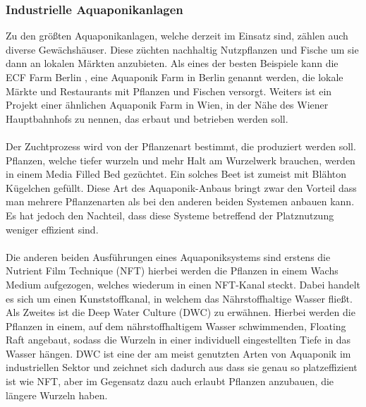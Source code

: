 
\subsubsection {Industrielle Aquaponikanlagen}
Zu den größten Aquaponikanlagen, welche derzeit im Einsatz sind, zählen auch diverse Gewächshäuser. Diese züchten nachhaltig Nutzpflanzen und Fische um sie dann an lokalen Märkten anzubieten. Als eines der besten Beispiele kann die ECF Farm Berlin \cite{ECF}, eine Aquaponik Farm in Berlin \cite{Aquaponik_Anlage_Wien} genannt werden, die lokale Märkte und Restaurants mit Pflanzen und Fischen versorgt. Weiters ist ein Projekt einer ähnlichen Aquaponik Farm in Wien, in der Nähe des Wiener Hauptbahnhofs zu nennen, das erbaut und betrieben werden soll.\\ \mbox{} \\
Der Zuchtprozess wird von der Pflanzenart bestimmt, die produziert werden soll. Pflanzen, welche tiefer wurzeln und mehr Halt am Wurzelwerk brauchen, werden in einem Media Filled Bed gezüchtet. Ein solches Beet ist zumeist mit Blähton Kügelchen gefüllt. Diese Art des Aquaponik-Anbaus bringt zwar den Vorteil dass man mehrere Pflanzenarten als bei den anderen beiden Systemen anbauen kann. Es hat jedoch den Nachteil, dass diese Systeme betreffend der Platznutzung weniger effizient sind. \\ \mbox{} \\ Die anderen beiden Ausführungen eines Aquaponiksystems sind erstens die Nutrient Film Technique (\gls{NFT}) hierbei werden die Pflanzen in einem Wachs Medium aufgezogen, welches wiederum in einen NFT-Kanal steckt. Dabei handelt es sich um einen Kunststoffkanal, in welchem das Nährstoffhaltige Wasser fließt. Als Zweites ist die Deep Water Culture (\gls{DWC}) zu erwähnen. Hierbei werden die Pflanzen in einem, auf dem nährstoffhaltigem Wasser schwimmenden, Floating Raft angebaut, sodass die Wurzeln in einer individuell eingestellten Tiefe in das Wasser hängen. \gls{DWC} ist eine der am meist genutzten Arten von Aquaponik im industriellen Sektor und zeichnet sich dadurch aus dass sie genau so platzeffizient ist wie \gls{NFT}, aber im Gegensatz dazu auch erlaubt Pflanzen anzubauen, die längere Wurzeln haben.

